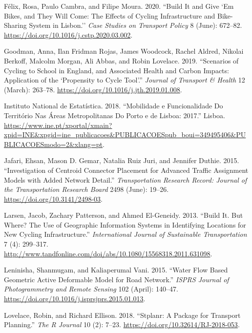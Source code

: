 \documentclass{isprs} %
\newlength{\cslhangindent}
\newlength{\cslentryspacingunit} %
\newenvironment{CSLReferences}[2] %
 {%
  \setlength{\parindent}{0pt}
  \ifodd #1
  \let\oldpar\par
  \def\par{\hangindent=\cslhangindent\oldpar}
  \fi
  \setlength{\parskip}{#2\cslentryspacingunit}
 }%
 {}
\begin{document}
\begin{CSLReferences}{1}{0}
\leavevmode{}%
Félix, Rosa, Paulo Cambra, and Filipe Moura. 2020. {``Build It and Give `Em Bikes, and They Will Come: {The} Effects of Cycling Infrastructure and Bike-Sharing System in {Lisbon}.''} \emph{Case Studies on Transport Policy} 8 (June): 672--82. \url{https://doi.org/10.1016/j.cstp.2020.03.002}.

\leavevmode{}%
Goodman, Anna, Ilan Fridman Rojas, James Woodcock, Rachel Aldred, Nikolai Berkoff, Malcolm Morgan, Ali Abbas, and Robin Lovelace. 2019. {``Scenarios of Cycling to School in {England}, and Associated Health and Carbon Impacts: {Application} of the {`{Propensity} to {Cycle Tool}'}.''} \emph{Journal of Transport \& Health} 12 (March): 263--78. \url{https://doi.org/10.1016/j.jth.2019.01.008}.

\leavevmode{}%
Instituto National de Estatística. 2018. {``Mobilidade e Funcionalidade Do Território Nas {Áreas Metropolitanas} Do {Porto} e de {Lisboa}: 2017.''} {Lisboa}. \url{https://www.ine.pt/xportal/xmain?xpid=INE\&xpgid=ine_publicacoes\&PUBLICACOESpub_boui=349495406\&PUBLICACOESmodo=2\&xlang=pt}.

\leavevmode{}%
Jafari, Ehsan, Mason D. Gemar, Natalia Ruiz Juri, and Jennifer Duthie. 2015. {``Investigation of {Centroid Connector Placement} for {Advanced Traffic Assignment Models} with {Added Network Detail}.''} \emph{Transportation Research Record: Journal of the Transportation Research Board} 2498 (June): 19--26. \url{https://doi.org/10.3141/2498-03}.

\leavevmode{}%
Larsen, Jacob, Zachary Patterson, and Ahmed El-Geneidy. 2013. {``Build It. {But} Where? {The} Use of Geographic Information Systems in Identifying Locations for New Cycling Infrastructure.''} \emph{International Journal of Sustainable Transportation} 7 (4): 299--317. \url{http://www.tandfonline.com/doi/abs/10.1080/15568318.2011.631098}.

\leavevmode{}%
Leninisha, Shanmugam, and Kaliaperumal Vani. 2015. {``Water Flow Based Geometric Active Deformable Model for Road Network.''} \emph{ISPRS Journal of Photogrammetry and Remote Sensing} 102 (April): 140--47. \url{https://doi.org/10.1016/j.isprsjprs.2015.01.013}.

\leavevmode{}%
Lovelace, Robin, and Richard Ellison. 2018. {``Stplanr: {A Package} for {Transport Planning}.''} \emph{The R Journal} 10 (2): 7--23. \url{https://doi.org/10.32614/RJ-2018-053}.


\end{CSLReferences}
\end{document}
